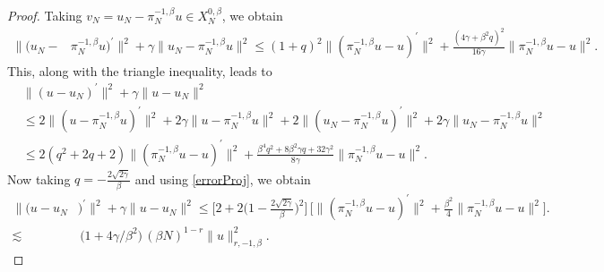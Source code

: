 \documentclass[10pt,reqno]{amsart}
\theoremstyle{remark}
\theoremstyle{definition}
\begin{document}
\begin{proof}
Taking $v_{N}=u_{N}-\pi_N^{-1,\beta}u\in X^{0,\beta}_N$, we obtain
\begin{align*}
\|(u_{N}-&\pi^{-1,\beta}_{N}u)^\prime\|^{2}+\gamma\|u_{N}-\pi^{-1,\beta}_{N}u\|^{2}
\le (1+q)^2 \big\|(\pi_N^{-1,\beta} u-u)^\prime\big\|^2 + \frac{(4\gamma+\beta^2q)^2}{16\gamma } \big\|\pi_N^{-1,\beta} u-u\big\|^2.
\end{align*}
This, along with the triangle inequality, leads to
\begin{align*}
&\|(u-u_{N})^\prime\|^{2}+\gamma \|u-u_{N}\|^{2}
\\ & \leq
2\|(u-\pi^{-1,\beta}_{N} u)^\prime\|^{2}+2\gamma \|u-\pi^{-1,\beta}_{N}u\|^{2}+2\|(u_{N}-\pi^{-1,\beta}_{N}u)^\prime\|^{2}+2\gamma \|u_{N}-\pi^{-1,\beta}_{N}u\|^{2}
\\
&\leq 
2 (q^2+2q+2) \big\|(\pi_N^{-1,\beta} u-u)^\prime\big\|^2 + \frac{\beta^4q^2+8\beta^2\gamma q+ 32 \gamma^2}{  8\gamma } \big\|\pi_N^{-1,\beta} u-u\big\|^2.
\end{align*}
Now taking $q=-\frac{2\sqrt{2\gamma}}{\beta}$ and using \eqref{errorProj}, we obtain
\begin{align*}
\|(u-u_{N}&)^\prime\|^{2}+\gamma \|u-u_{N}\|^{2} \le
\big[2+2\big(1-\tfrac{2\sqrt{2\gamma}}{\beta}\big)^2\big]\,
\Big[ \big\|(\pi_N^{-1,\beta} u-u)^\prime\big\|^2 + \frac{\beta^2}{4} \big\|\pi_N^{-1,\beta} u-u\big\|^2\Big].
\\
\lesssim&\, \big(1+ 4\gamma/\beta^2\big)\,  (\beta N)^{1-r} \|u\|^{2}_{r,-1,\beta} .
\end{align*}


\end{proof}
\end{document}
